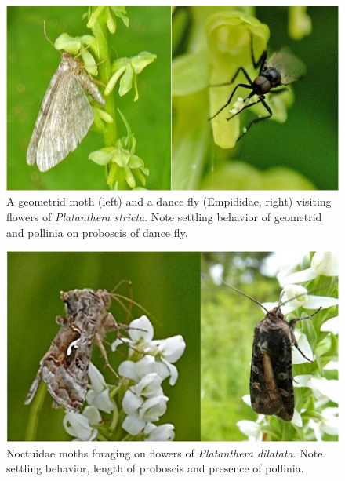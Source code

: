 \begin{multicols}{2}
\begin{figure}[H]
\begin{center}
\vspace{2mm}
\includegraphics[width=\textwidth]{img/moth_empidid.jpg}
\caption{A geometrid moth (left) and a dance fly (Empididae, right) visiting flowers of \emph{Platanthera stricta}.  Note settling behavior of geometrid and pollinia on proboscis of dance fly.}
\label{moth_empidid}
\end{center}
\end{figure}

\begin{figure}[H]
\begin{center}
\vspace{2mm}
\includegraphics[width=\textwidth]{img/Platanthera_dilatata_Noctuidae.jpg}
\caption{Noctuidae moths foraging on flowers of \emph{Platanthera dilatata}. Note settling behavior, length of proboscis and presence of pollinia.}
\label{Platanthera_dilatata_Noctuidae}
\end{center}
\end{figure}


\end{multicols}
